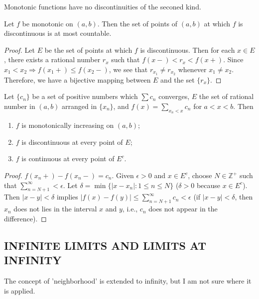 \begin{corollary}
Monotonic functions have no discontinuities of the seconed kind.
\end{corollary}

\begin{theorem}
Let $f$ be monotonic on $(a,b)$. Then the set of points of $(a,b)$ at which $f$ is discontinuous is at most countable.
\end{theorem}
\begin{proof}
Let $E$ be the set of points at which $f$ is discontinuous. Then for each $x\in E$, there exists a rational number $r_x$ such that $f(x-)<r_x<f(x+)$. Since $x_1<x_2\Rightarrow f(x_1+)\leq f(x_2-)$, we see that $r_{x_1}\neq r_{x_2}$ whenever $x_1\neq x_2$. Therefore, we have a bijective mapping between $E$ and the set $\{r_x\}$.
\end{proof}

\begin{example}
Let $\{c_n\}$ be a set of positive numbers which $\sum c_n$ converges, $E$ the set of rational number in $(a,b)$ arranged in $\{x_n\}$, and $f(x)=\sum\limits_{x_n<x}c_n$ for $a<x<b$. Then
\begin{enumerate}[label={(\arabic*)}]
\item $f$ is monotonically increasing on $(a,b)$;
\item $f$ is discontinuous at every point of $E$;
\item $f$ is continuous at every point of $E^c$.
\end{enumerate}
\end{example}
\begin{proof}
 $f(x_n+)-f(x_n-)=c_n$.
 Given $\epsilon>0$ and $x\in E^c$, choose $N\in \mathbb{Z}^+$ such that $\sum\limits_{n=N+1}^\infty < \epsilon$. Let $\delta = \min \{|x-x_n|:1\leq n\leq N\}$ ($\delta>0$ because $x\in E^c$). Then $|x-y|<\delta$ implies $|f(x)-f(y)|\leq \sum_{n=N+1}^\infty c_n<\epsilon$ (if $|x-y|<\delta$, then $x_n$ does not lies in the interval $x$ and $y$, i.e., $c_n$ does not appear in the difference).
\end{proof}

\subsection{INFINITE LIMITS AND LIMITS AT INFINITY}
\begin{notebox}
The concept of 'neighborhood' is extended to infinity, but I am not sure where it is applied.
\end{notebox}

